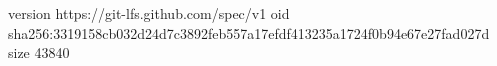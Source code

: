 version https://git-lfs.github.com/spec/v1
oid sha256:3319158cb032d24d7c3892feb557a17efdf413235a1724f0b94e67e27fad027d
size 43840
